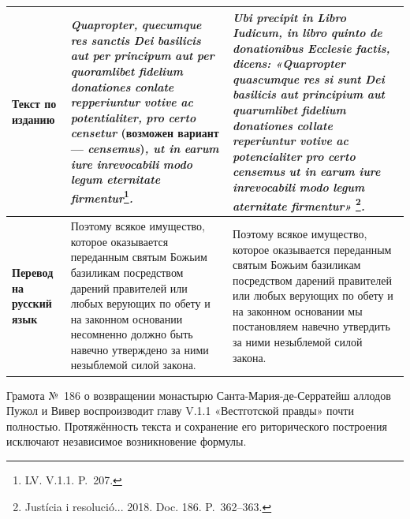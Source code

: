\begin{center}
\begin{longtable}{|p{}|p{}|p{}|}
\textbf{Текст по изданию} & \emph{Quapropter}\emph{, }\emph{quecumque}\emph{ }\emph{res}\emph{ }\emph{sanctis}\emph{ Dei }\emph{basilicis}\emph{ }\emph{aut}\emph{ }\emph{per}\emph{ }\emph{principum}\emph{ }\emph{aut}\emph{ }\emph{per}\emph{ }\emph{quoramlibet}\emph{ }\emph{fidelium}\emph{ }\emph{donationes}\emph{ }\emph{conlate}\emph{ }\emph{repperiuntur}\emph{ }\emph{votive}\emph{ }\emph{ac}\emph{ }\emph{potentialiter}\emph{, }\emph{pro}\emph{ }\emph{certo}\emph{ }\emph{censetur} (возможен вариант --- \emph{censemus})\emph{, ut in }\emph{earum}\emph{ }\emph{iure}\emph{ }\emph{inrevocabili}\emph{ }\emph{modo}\emph{ }\emph{legum}\emph{ }\emph{eternitate}\emph{ }\emph{firmentur}\footnote{LV. V.1.1. P.~207.}\emph{.} & \emph{Ubi}\emph{ }\emph{precipit}\emph{ in }\emph{Libro}\emph{ }\emph{Iudicum}\emph{, in }\emph{libro}\emph{ }\emph{quinto}\emph{ de }\emph{donationibus}\emph{ }\emph{Ecclesie}\emph{ }\emph{factis}\emph{, }\emph{dicens}\emph{: «}\emph{Quapropter}\emph{ }\emph{quascumque}\emph{ }\emph{res}\emph{ }\emph{si}\emph{ }\emph{sunt}\emph{ Dei }\emph{basilicis}\emph{ }\emph{aut}\emph{ }\emph{principium}\emph{ }\emph{aut}\emph{ }\emph{quarumlibet}\emph{ }\emph{fidelium}\emph{ }\emph{donationes}\emph{ }\emph{collate}\emph{ }\emph{reperiuntur}\emph{ }\emph{votive}\emph{ }\emph{ac}\emph{ }\emph{potencialiter}\emph{ }\emph{pro}\emph{ }\emph{certo}\emph{ }\emph{censemus}\emph{ ut in }\emph{earum}\emph{ }\emph{iure}\emph{ }\emph{inrevocabili}\emph{ }\emph{modo}\emph{ }\emph{legum}\emph{ }\emph{aternitate}\emph{ }\emph{firmentur}\emph{»}\emph{\textsuperscript{ }}\footnote{Justícia i resolució... 2018. Doc. 186. P.~362--363.}\emph{.} \\ \hline
\textbf{Перевод на русский язык} & Поэтому всякое имущество, которое оказывается переданным святым Божьим базиликам посредством дарений правителей или любых верующих по обету и на законном основании несомненно должно быть навечно утверждено за ними незыблемой силой закона. & Поэтому всякое имущество, которое оказывается переданным святым Божьим базиликам посредством дарений правителей или любых верующих по обету и на законном основании мы постановляем навечно утвердить за ними незыблемой силой закона. \\ \hline
\end{longtable}
\end{center}

Грамота №~186 о возвращении монастырю Санта-Мария-де-Серратейш аллодов Пужол и Вивер воспроизводит главу V.1.1 «Вестготской правды» почти полностью. Протяжённость текста и сохранение его риторического построения исключают независимое возникновение формулы.


